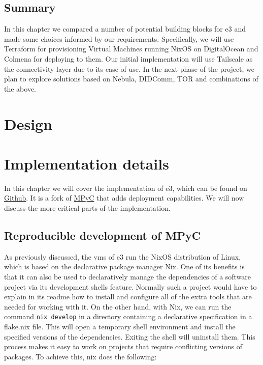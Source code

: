 \hypertarget{summary}{%
\section{Summary}\label{summary}}

In this chapter we compared a number of potential building blocks for
\gls{e3} and made some choices informed by our requirements.
Specifically, we will use Terraform for provisioning Virtual Machines
running NixOS on DigitalOcean and Colmena for deploying to them. Our
initial implementation will use Tailscale as the connectivity layer due
to its ease of use. In the next phase of the project, we plan to explore
solutions based on Nebula, DIDComm, TOR and combinations of the above.

\hypertarget{design}{%
\chapter{Design}\label{design}}

\hypertarget{section}{%
\section{}\label{section}}

\hypertarget{implementation-details}{%
\chapter{Implementation details}\label{implementation-details}}

In this chapter we will cover the implementation of \gls{e3}, which can
be found on \href{https://github.com/e-nikolov/mpyc}{Github}. It is a
fork of \href{https://github.com/lschoe/mpyc}{MPyC} that adds deployment
capabilities. We will now discuss the more critical parts of the
implementation.

\hypertarget{reproducible-development-of-mpyc}{%
\section{Reproducible development of
MPyC}\label{reproducible-development-of-mpyc}}

As previously discussed, the \glspl{vm} of \gls{e3} run the NixOS
distribution of Linux, which is based on the declarative package manager
Nix. One of its benefits is that it can also be used to declaratively
manage the dependencies of a software project via its development shells
feature. Normally such a project would have to explain in its readme how
to install and configure all of the extra tools that are needed for
working with it. On the other hand, with Nix, we can run the command
\texttt{nix\ develop} in a directory containing a declarative
specification in a flake.nix file. This will open a temporary shell
environment and install the specified versions of the dependencies.
Exiting the shell will uninstall them. This process makes it easy to
work on projects that require conflicting versions of packages. To
achieve this, nix does the following:


